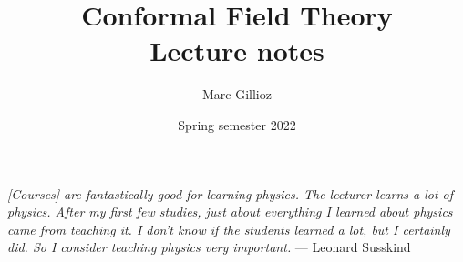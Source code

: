 \documentclass[a4paper,12pt]{article}
\title{%
Conformal Field Theory
\\[1em]
\Large
Lecture notes}
\author{Marc Gillioz}
\date{Spring semester 2022}
\numberwithin{equation}{section}
\begin{document}
 

\maketitle

\vspace{10mm}	
	
\begin{center}
	

	
\vspace{20mm}
	
\parbox{11.8cm}{
\emph{%
[Courses] are fantastically good for learning physics. The lecturer learns a lot of physics. After my first few studies, just about everything I learned about physics came from teaching it. I don’t know if the students learned a lot, but I certainly did. So I consider teaching physics very important.}
--- Leonard Susskind \cite{Susskind}}

\end{center}


\newpage

\tableofcontents

\end{document}
